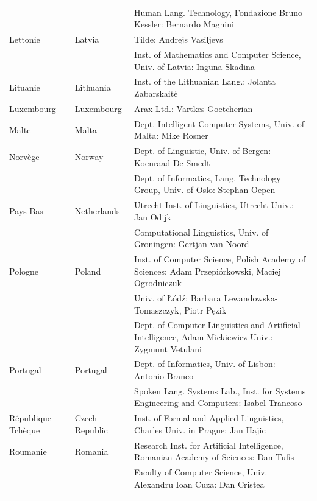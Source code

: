 \documentclass[]{../metanetpaper}
\begin{document}
\begin{longtable}{llp{105mm}}
  & & Human Lang. Technology, Fondazione Bruno Kessler: Bernardo Magnini\\ \addlinespace 
  Lettonie & \textcolor{grey1}{Latvia} & Tilde: Andrejs Vasiljevs\\ \addlinespace 
  & & Inst. of Mathematics and Computer Science, Univ. of Latvia: Inguna Skadina\\ \addlinespace
  Lituanie & \textcolor{grey1}{Lithuania} & Inst. of the Lithuanian Lang.: Jolanta Zabarskaitė\\ \addlinespace
  Luxembourg & \textcolor{grey1}{Luxembourg} & Arax Ltd.: Vartkes Goetcherian\\ \addlinespace
  Malte & \textcolor{grey1}{Malta} & Dept. Intelligent Computer Systems, Univ. of Malta: Mike Rosner\\ \addlinespace
  Norvège & \textcolor{grey1}{Norway} & Dept. of Linguistic, Univ. of Bergen: Koenraad De Smedt\\ \addlinespace 
  & & Dept. of Informatics, Lang. Technology Group, Univ. of Oslo: Stephan Oepen \\ \addlinespace
  Pays-Bas & \textcolor{grey1}{Netherlands} & Utrecht Inst. of Linguistics, Utrecht Univ.: Jan Odijk\\ \addlinespace 
  & & Computational Linguistics, Univ. of Groningen: Gertjan van Noord\\ \addlinespace
  Pologne & \textcolor{grey1}{Poland} & Inst. of Computer Science, Polish Academy of Sciences: Adam Przepiórkowski, Maciej Ogrodniczuk \\ \addlinespace
  & & Univ. of Łódź: Barbara Lewandowska-Tomaszczyk, Piotr Pęzik\\ \addlinespace
  & & Dept. of Computer Linguistics and Artificial Intelligence, Adam Mickiewicz Univ.: Zygmunt Vetulani \\ \addlinespace
  Portugal & \textcolor{grey1}{Portugal} & Dept. of Informatics, Univ. of Lisbon: Antonio Branco\\ \addlinespace
  & & Spoken Lang. Systems Lab., Inst. for Systems Engineering and Computers: Isabel Trancoso \\ \addlinespace
  République Tchèque& \textcolor{grey1}{Czech Republic} & Inst. of Formal and Applied Linguistics, Charles Univ. in Prague: Jan Hajic \\ \addlinespace
  Roumanie & \textcolor{grey1}{Romania} & Research Inst. for Artificial Intelligence, Romanian Academy of Sciences: Dan Tufis \\ \addlinespace
  & & Faculty of Computer Science, Univ. Alexandru Ioan Cuza: Dan Cristea \\ \addlinespace

\end{longtable}
\end{document}
